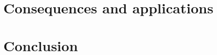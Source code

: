 \documentclass[12pt, a4paper]{report}
\newcommand\PT{\(\mathcal{PT}\)}
\begin{document}


\chapter{Consequences and applications}\label{Consq}







\chapter{Conclusion}\label{Conclusion}






\end{document}
